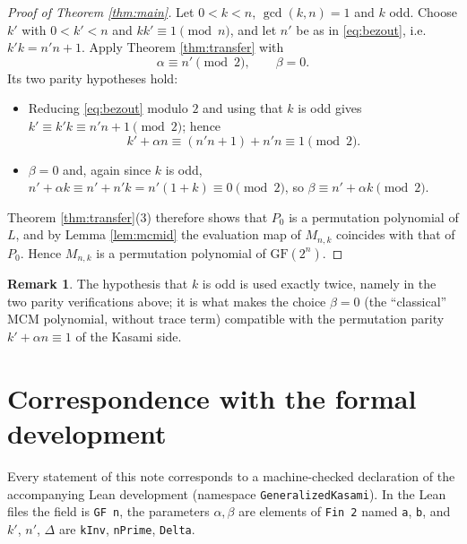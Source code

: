 \documentclass[11pt,a4paper]{article}
\theoremstyle{definition}
\newtheorem{remark}[theorem]{Remark}
\newcommand{\GF}{\mathrm{GF}}
\begin{document}
\begin{proof}[Proof of Theorem \ref{thm:main}]
Let $0<k<n$, $\gcd(k,n)=1$ and $k$ odd.  Choose $k'$ with $0<k'<n$ and
$kk'\equiv1\pmod n$, and let $n'$ be as in \eqref{eq:bezout}, i.e.
$k'k=n'n+1$.  Apply Theorem \ref{thm:transfer} with
\[
  \alpha\equiv n' \pmod 2,\qquad \beta=0 .
\]
Its two parity hypotheses hold:
\begin{itemize}
\item Reducing \eqref{eq:bezout} modulo $2$ and using that $k$ is odd gives
      $k'\equiv k'k\equiv n'n+1\pmod2$; hence
      \[
        k'+\alpha n\equiv (n'n+1)+n'n\equiv1 \pmod 2 .
      \]
\item $\beta=0$ and, again since $k$ is odd,
      $n'+\alpha k\equiv n'+n'k=n'(1+k)\equiv0\pmod 2$, so
      $\beta\equiv n'+\alpha k \pmod 2$.
\end{itemize}
Theorem \ref{thm:transfer}(3) therefore shows that $P_0$ is a permutation
polynomial of $L$, and by Lemma \ref{lem:mcmid} the evaluation map of $M_{n,k}$
coincides with that of $P_0$.  Hence $M_{n,k}$ is a permutation polynomial of
$\GF(2^{n})$.
\end{proof}

\begin{remark}
The hypothesis that $k$ is odd is used exactly twice, namely in the two parity
verifications above; it is what makes the choice $\beta=0$ (the ``classical'' MCM
polynomial, without trace term) compatible with the permutation parity
$k'+\alpha n\equiv1$ of the Kasami side.
\end{remark}

\appendix

\section{Correspondence with the formal development}\label{app:lean}

Every statement of this note corresponds to a machine-checked declaration of the
accompanying Lean development (namespace \texttt{GeneralizedKasami}).  In the Lean
files the field is \texttt{GF n}, the parameters $\alpha,\beta$ are elements of
\texttt{Fin 2} named \texttt{a}, \texttt{b}, and $k'$, $n'$, $\Delta$ are
\texttt{kInv}, \texttt{nPrime}, \texttt{Delta}.
\end{document}
